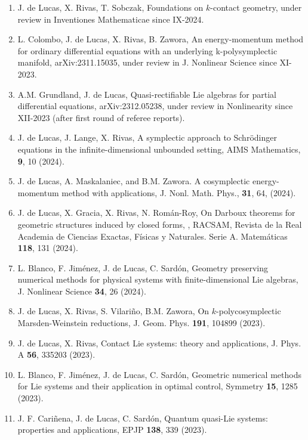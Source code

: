 \documentclass[12pt,reqno]{amsbook}
\begin{document}
\begin{enumerate}
\item J. de Lucas, X. Rivas, T. Sobczak, \color{blue} Foundations on  $k$-contact geometry, \color{black} under review in  Inventiones Mathematicae since IX-2024.
\item L. Colombo, J. de Lucas, X. Rivas, B. Zawora, \color{blue} An energy-momentum method for ordinary differential
equations with an underlying k-polysymplectic manifold\color{black}, arXiv:2311.15035, under review in  J. Nonlinear Science since XI-2023.


 \item A.M. Grundland, J. de Lucas, \color{blue} Quasi-rectifiable Lie algebras
 for partial differential equations\color{black}, arXiv:2312.05238, under review in Nonlinearity since XII-2023 (after first round of referee reports).
  \item J. de Lucas, J. Lange, X. Rivas, \color{blue} A symplectic approach to Schr\"odinger equations in the infinite-dimensional unbounded setting\color{black},  AIMS Mathematics, {\bf 9}, 10 (2024).
 


\item  J. de Lucas, A. Maskalaniec, and B.M. Zawora. \color{blue} A cosymplectic energy-momentum method with applications\color{black}, J. Nonl. Math. Phys., {\bf 31}, 64, (2024).

\item J. de Lucas, X. Gracia, X. Rivas, N. Rom\'an-Roy, \color{blue} On Darboux theorems for geometric structures
induced by closed forms, \color{black}, RACSAM, Revista de la Real Academia de Ciencias Exactas, Físicas y Naturales. Serie A. Matemáticas {\bf 118}, 131 (2024).

 \item L. Blanco, F. Jim\'enez, J. de Lucas, C. Sard\'on, \color{blue} Geometry preserving numerical methods for physical systems with finite-dimensional Lie algebras\color{black}, J. Nonlinear Science {\bf 34}, 26 (2024).


\item J. de Lucas, X. Rivas, S. Vilariño, B.M. Zawora, \color{blue} On $k$-polycosymplectic Marsden-Weinstein reductions, \color{black} J. Geom. Phys. {\bf 191}, 104899 (2023).

\item  J. de Lucas, X. Rivas, \color{blue} Contact Lie systems: theory and applications, \color{black} J. Phys. A {\bf 56}, 335203 (2023).

\item  L. Blanco, F. Jim\'enez, J. de Lucas, C. Sard\'on, \color{blue} Geometric numerical methods for Lie systems and their application in optimal control\color{black}, Symmetry {\bf 15}, 1285 (2023).
\item  J. F. Cari\~nena, J. de Lucas, C. Sard\'on, \color{blue} Quantum quasi-Lie systems: properties and applications, \color{black} EPJP {\bf 138}, 339 (2023).%


\end{enumerate}
\end{document}
